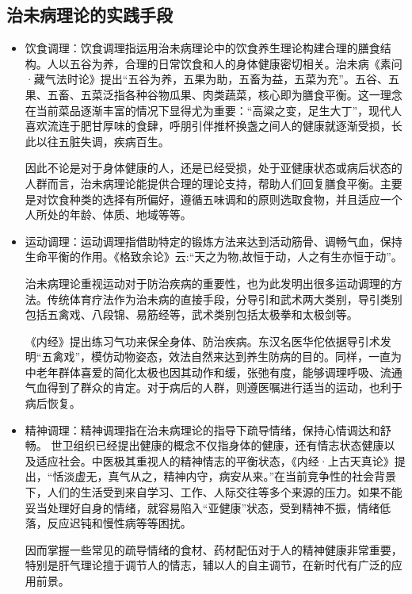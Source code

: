 \subsection{治未病理论的实践手段}
\begin{itemize}
\item 饮食调理：饮食调理指运用治未病理论中的饮食养生理论构建合理的膳食结构。人以五谷为养，合理的日常饮食和人的身体健康密切相关。治未病《素问·藏气法时论》提出“五谷为养，五果为助，五畜为益，五菜为充”。五谷、五果、五畜、五菜泛指各种谷物瓜果、肉类蔬菜，核心即为膳食平衡。这一理念在当前菜品逐渐丰富的情况下显得尤为重要：“高粱之变，足生大丁”，现代人喜欢流连于肥甘厚味的食肆，呼朋引伴推杯换盏之间人的健康就逐渐受损，长此以往五脏失调，疾病百生。

因此不论是对于身体健康的人，还是已经受损，处于亚健康状态或病后状态的人群而言，治未病理论能提供合理的理论支持，帮助人们回复膳食平衡。主要是对饮食种类的选择有所偏好，遵循五味调和的原则选取食物，并且适应一个人所处的年龄、体质、地域等等。

\item 运动调理：运动调理指借助特定的锻炼方法来达到活动筋骨、调畅气血，保持生命平衡的作用。《格致余论》云:“天之为物,故恒于动，人之有生亦恒于动”。

治未病理论重视运动对于防治疾病的重要性，也为此发明出很多运动调理的方法。传统体育疗法作为治未病的直接手段，分导引和武术两大类别，导引类别包括五禽戏、八段锦、易筋经等，武术类别包括太极拳和太极剑等。\cite{贾天奇2007传统体育疗法与未病学}

《内经》提出练习气功来保全身体、防治疾病。东汉名医华佗依据导引术发明“五禽戏”，模仿动物姿态，效法自然来达到养生防病的目的。同样，一直为中老年群体喜爱的简化太极也因其动作和缓，张弛有度，能够调理呼吸、流通气血得到了群众的肯定。对于病后的人群，则遵医嘱进行适当的运动，也利于病后恢复。

\item 精神调理：精神调理指在治未病理论的指导下疏导情绪，保持心情调达和舒畅。
世卫组织已经提出健康的概念不仅指身体的健康，还有情志状态健康以及适应社会。中医极其重视人的精神情志的平衡状态，《内经·上古天真论》提出，“恬淡虚无，真气从之，精神内守，病安从来。”在当前竞争性的社会背景下，人们的生活受到来自学习、工作、人际交往等多个来源的压力。如果不能妥当处理好自身的情绪，就容易陷入“亚健康”状态，受到精神不振，情绪低落，反应迟钝和慢性病等等困扰。

因而掌握一些常见的疏导情绪的食材、药材配伍对于人的精神健康非常重要，特别是肝气理论擅于调节人的情志，辅以人的自主调节，在新时代有广泛的应用前景。
\end{itemize}